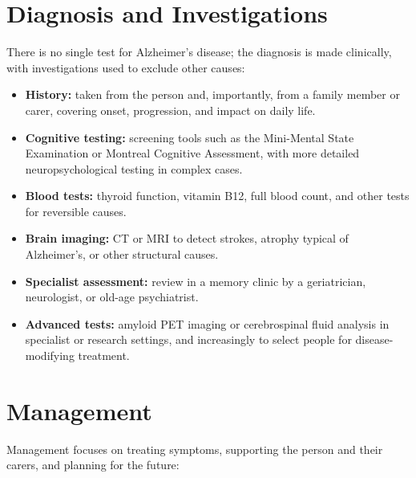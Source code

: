 \section*{Diagnosis and Investigations}
There is no single test for Alzheimer's disease; the diagnosis is made clinically, with investigations used to exclude other causes:

\begin{itemize}
    \item \textbf{History:} taken from the person and, importantly, from a family member or carer, covering onset, progression, and impact on daily life.
    \item \textbf{Cognitive testing:} screening tools such as the Mini-Mental State Examination or Montreal Cognitive Assessment, with more detailed neuropsychological testing in complex cases.
    \item \textbf{Blood tests:} thyroid function, vitamin B12, full blood count, and other tests for reversible causes.
    \item \textbf{Brain imaging:} CT or MRI to detect strokes, atrophy typical of Alzheimer's, or other structural causes.
    \item \textbf{Specialist assessment:} review in a memory clinic by a geriatrician, neurologist, or old-age psychiatrist.
    \item \textbf{Advanced tests:} amyloid PET imaging or cerebrospinal fluid analysis in specialist or research settings, and increasingly to select people for disease-modifying treatment.
\end{itemize}

\section*{Management}
Management focuses on treating symptoms, supporting the person and their carers, and planning for the future:

